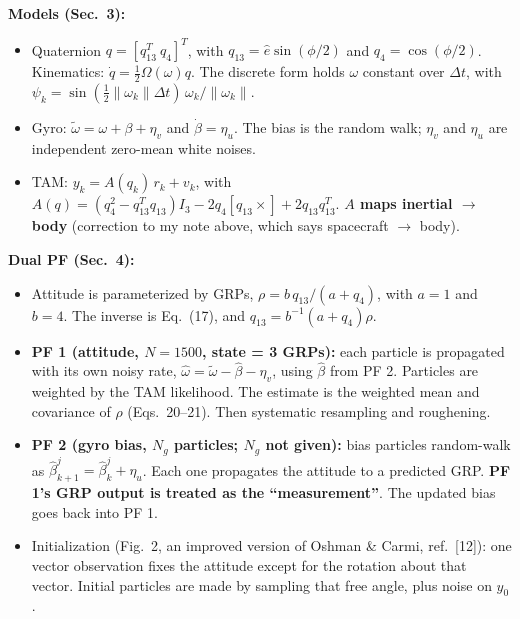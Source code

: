 \documentclass[11pt]{article}
\begin{document}
\textbf{Models (Sec.\ 3):}
\begin{itemize}[noitemsep]
    \item Quaternion $q = [q_{13}^T\ q_4]^T$, with $q_{13} = \hat{e}\sin(\phi/2)$ and $q_4 = \cos(\phi/2)$. Kinematics: $\dot{q} = \frac{1}{2}\Omega(\omega)q$. The discrete form holds $\omega$ constant over $\Delta t$, with $\psi_k = \sin(\frac{1}{2}\|\omega_k\|\Delta t)\,\omega_k/\|\omega_k\|$.
    \item Gyro: $\tilde{\omega} = \omega + \beta + \eta_v$ and $\dot{\beta} = \eta_u$. The bias is the random walk; $\eta_v$ and $\eta_u$ are independent zero-mean white noises.
    \item TAM: $y_k = A(q_k)\,r_k + v_k$, with $A(q) = (q_4^2 - q_{13}^Tq_{13})I_3 - 2q_4[q_{13}\times] + 2q_{13}q_{13}^T$. \textbf{$A$ maps inertial $\rightarrow$ body} (correction to my note above, which says spacecraft $\rightarrow$ body).
\end{itemize}

\textbf{Dual PF (Sec.\ 4):}
\begin{itemize}[noitemsep]
    \item Attitude is parameterized by GRPs, $\rho = b\,q_{13}/(a+q_4)$, with $a = 1$ and $b = 4$. The inverse is Eq.\ (17), and $q_{13} = b^{-1}(a+q_4)\rho$.
    \item \textbf{PF 1 (attitude, $N = 1500$, state = 3 GRPs):} each particle is propagated with its own noisy rate, $\hat{\omega} = \tilde{\omega} - \hat{\beta} - \eta_v$, using $\hat{\beta}$ from PF 2. Particles are weighted by the TAM likelihood. The estimate is the weighted mean and covariance of $\rho$ (Eqs.\ 20--21). Then systematic resampling and roughening.
    \item \textbf{PF 2 (gyro bias, $N_g$ particles; $N_g$ not given):} bias particles random-walk as $\hat{\beta}^j_{k+1} = \hat{\beta}^j_k + \eta_u$. Each one propagates the attitude to a predicted GRP. \textbf{PF 1's GRP output is treated as the ``measurement''}. The updated bias goes back into PF 1.
    \item Initialization (Fig.\ 2, an improved version of Oshman \& Carmi, ref.\ [12]): one vector observation fixes the attitude except for the rotation about that vector. Initial particles are made by sampling that free angle, plus noise on $y_0$.
\end{itemize}
\end{document}
